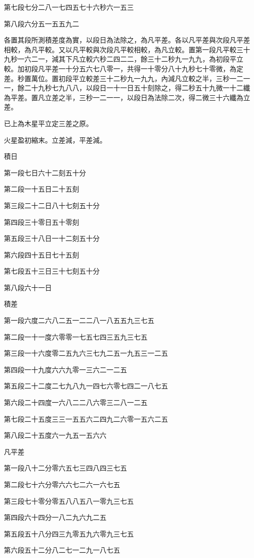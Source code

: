 第七段七分二八一七四五七十六秒六一五三

第八段六分五一五五九二

各置其段所測積差度為實，以段日為法除之，為凡平差。各以凡平差與次段凡平差相較，為凡平較。又以凡平較與次段凡平較相較，為凡立較。置第一段凡平較三十九秒一六二一，減其下凡立較六秒二四二二，餘三十二秒九一九九，為初段平立較。加初段凡平差一十分五六七八零一，共得一十零分八十九秒七十零微，為定差。秒置萬位。置初段平立較差三十二秒九一九九，內減凡立較之半，三秒一二一一，餘二十九秒七九八八，以段日一十一日五十刻除之，得二秒五十九微一十二纖為平差。置凡立差之半，三秒一二一一，以段日為法除二次，得二微三十六纖為立差。

已上為木星平立定三差之原。

火星盈初縮末。立差減，平差減。

積日

第一段七日六十二刻五十分

第二段一十五日二十五刻

第三段二十二日八十七刻五十分

第四段三十零日五十零刻

第五段三十八日一十二刻五十分

第六段四十五日七十五刻

第七段五十三日三十七刻五十分

第八段六十一日

積差

第一段六度二六八二五一二二八一八五五九三七五

第二段一十一度六零零一七五七四三五九三七五

第三段一十六度零二五九六三七九二五一九五三一二五

第四段一十九度六六九零一三六二一二五

第五段二十二度二七九八九一四七六零七四二一八七五

第六段二十四度一六八二二八六零三二八一二五

第七段二十五度三三一五五六二四九二六零一五六二五

第八段二十五度六一九五一五六六

凡平差

第一段八十二分零六五七三四八四三七五

第二段七十六分零六六七二六一六七五

第三段七十零分零五八八五八一零九三七五

第四段六十四分一八二九六九二五

第五段五十八分四三九零五九六零九三七五

第六段五十二分八二七一二九一八七五

